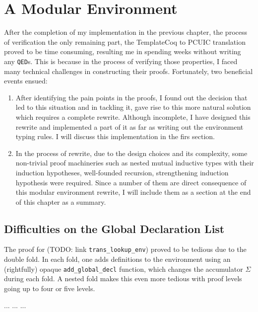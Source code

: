 \chapter{A Modular Environment}

After the completion of my implementation in the previous chapter, the process
of verification the only remaining part, the TemplateCoq to PCUIC translation
proved to be time consuming, resulting me in spending weeks without writing any
\verb|QED|s. This is because in the process of verifying those properties, I
faced many technical challenges in constructing their proofs. Fortunately, two
beneficial events ensued:
\begin{enumerate}
  \item After identifying the pain points in the proofs, I found out the
  decision that led to this situation and in tackling it, gave rise to this more
  natural solution which requires a complete rewrite. Although incomplete, I
  have designed this rewrite and implemented a part of it as far as writing out
  the environment typing rules. I will discuss this implementation in the firs
  section.
  \item In the process of rewrite, due to the design choices and its complexity,
  some non-trivial proof machineries such as nested mutual inductive types with
  their induction hypotheses, well-founded recursion, strengthening induction
  hypothesis were required. Since a number of them are direct consequence of
  this modular environment rewrite, I will include them as a section at the end
  of this chapter as a summary.
\end{enumerate}


\section{Difficulties on the Global Declaration List}

The proof for (TODO: link \verb|trans_lookup_env|) proved to be tedious due to
the double fold. In each fold, one adds definitions to the environment using an
(rightfully) opaque \verb|add_global_decl| function, which changes the
accumulator $\Sigma$ during each fold. A nested fold makes this even more
tedious with proof levels going up to four or five levels.

...
...
...

